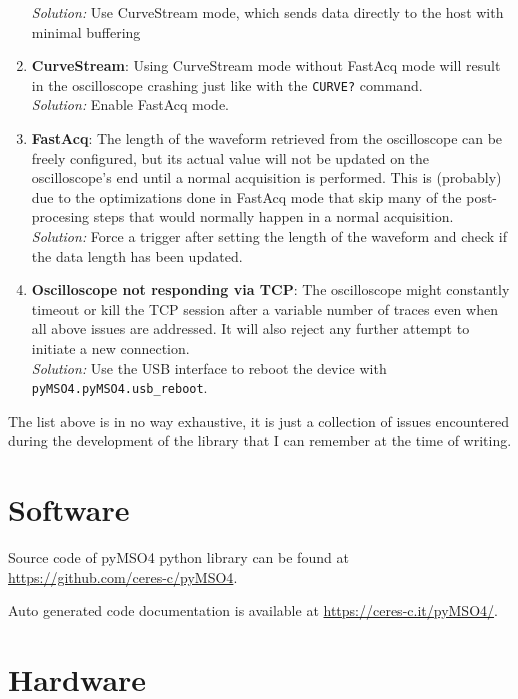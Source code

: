 \documentclass[a4paper,english,twoside,10pt]{article}
\begin{document}
\begin{enumerate}[label=\textbf{P.\arabic*},ref=P.\arabic*]
	\textit{Solution:} Use CurveStream mode, which sends data directly to the host with minimal buffering
	\item \textbf{CurveStream}: Using CurveStream mode without FastAcq mode will result in the oscilloscope crashing just like with the \texttt{CURVE?} command.\\
	\textit{Solution:} Enable FastAcq mode.
	\item \textbf{FastAcq}\label{item:fastacq}: The length of the waveform retrieved from the oscilloscope can be freely configured, but its actual value will not be updated on the oscilloscope's end until a normal acquisition is performed. This is (probably) due to the optimizations done in FastAcq mode that skip many of the post-procesing steps that would normally happen in a normal acquisition.\\
	\textit{Solution:} Force a trigger after setting the length of the waveform and check if the data length has been updated.
	\item \textbf{Oscilloscope not responding via TCP}: The oscilloscope might constantly timeout or kill the TCP session after a variable number of traces even when all above issues are addressed. It will also reject any further attempt to initiate a new connection.\\
	\textit{Solution:} Use the USB interface to reboot the device with \texttt{pyMSO4.pyMSO4.usb\_reboot}.
\end{enumerate}

The list above is in no way exhaustive, it is just a collection of issues encountered during the development of the library that I can remember at the time of writing.

\clearpage%
\printglossary[type=\acronymtype,nogroupskip]%
\printglossary[nogroupskip]%
\printindex%
{
\raggedright%
\nocite{ico:oscilloscope}
\nocite{ico:laptop}


}

\clearpage%
\appendix%
\section{Software}\label{app:software}
Source code of pyMSO4 python library can be found at \url{https://github.com/ceres-c/pyMSO4}.

\noindent Auto generated code documentation is available at \url{https://ceres-c.it/pyMSO4/}.
\section{Hardware}\label{app:hardware}
\end{document}
